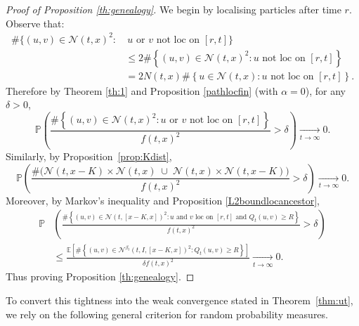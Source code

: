 \documentclass{article}
\newcommand{\E}[0]{\mathbb{E}}
\newcommand{\Prob}{\mathbb{P}}
\begin{document}
\begin{proof}[Proof of Proposition \ref{th:genealogy}]
We begin by localising particles after time \( r \). Observe that:
\begin{equation}
\begin{split}
    \#\big\{(u,v) \in \mathcal{N}(t,x)^2 :& \ u \text{ or } v \text{ not loc on } [r,t] \big\}\\& \leq 2\#\left\{(u,v) \in \mathcal{N}(t,x)^2 : u \text{ not loc on } [r,t] \right\}
    \\& =2N(t,x)\#\left\{u \in \mathcal{N}(t,x) : u \text{ not loc on } [r,t]\right\}.
\end{split}
\end{equation}
Therefore by Theorem \ref{th:1} and Proposition \ref{pathlocfin} (with $\alpha=0$), for any $\delta>0$,
\begin{equation}
    \Prob\left(\frac{\#\left\{(u,v) \in \mathcal{N}(t,x)^2 : u \text{ or } v \text{ not loc on } [r,t] \right\}}{f(t,x)^2}>\delta \right)\xrightarrow[t\rightarrow \infty]{} 0.
\end{equation}
Similarly, by Proposition~\ref{prop:Kdist},
\begin{equation}
\Prob\left(
\frac{
\#\Big(
\mathcal{N}(t,x-K)\times \mathcal{N}(t,x)
\;\cup\;
\mathcal{N}(t,x)\times \mathcal{N}(t,x-K)
\Big)
}{f(t,x)^2}
> \delta
\right)
\xrightarrow[t\to\infty]{} 0 .
\end{equation}
Moreover, by Markov's inequality and Proposition \ref{L2boundlocancestor},
\begin{equation}
\begin{split}
    \Prob&\left(\frac{\#\left\{(u,v) \in \mathcal{N}(t,[x-K,x])^2 : u \text{ and } v \text{ loc on } [r,t] \text{ and } Q_t(u,v) \geq R \right\}}{f(t,x)^2}>\delta \right)
    \\&\leq \frac{\E\left[\#\left\{(u,v) \in \mathcal{N}^{\beta_t}(t,I,[x-K,x])^2 : Q_t(u,v) \geq R \right\}\right]}{\delta f(t,x)^2}\xrightarrow[t\rightarrow \infty]{}0.
\end{split}
\end{equation}
Thus proving Proposition \ref{th:genealogy}.
\end{proof}

To convert this tightness into the weak convergence stated in Theorem~\ref{thm:ut}, we rely on the following general criterion for random probability measures.
\end{document}
